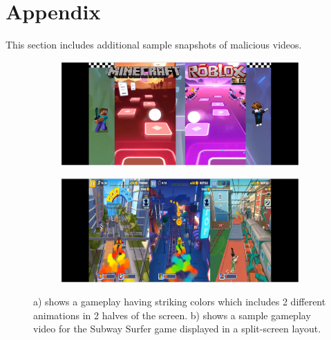 \clearpage
\onecolumn
\section*{Appendix}
This section includes additional sample snapshots of malicious videos.




\begin{figure}[!htb]
  \centering

  \begin{subfigure}{0.45\textwidth}
    \centering
    \includegraphics[width=\textwidth]{figures/malicious7.png}
    \caption{}
    \label{fig:image_a}
  \end{subfigure}
  \hfill
  \begin{subfigure}{0.45\textwidth}
    \centering
    \includegraphics[width=\textwidth]{figures/malicious8.png}
    \caption{}
    \label{fig:image_b}
  \end{subfigure}

  \caption{a) shows a gameplay having striking colors which includes 2 different animations in 2 halves of the screen. b) shows a sample gameplay video for the Subway Surfer game displayed in a split-screen layout.}
  \label{fig:group_of_images}
\end{figure}


